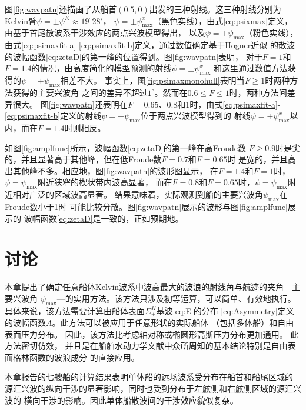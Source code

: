 图\ref{fig:wavpatn}还描画了从船首$(0.5,0)$出发的三种射线。这三种射线分别为
Kelvin臂$\psi=\pm\psi^K\approx19^\circ28'$，
$\psi=\pm\psi^x_{\max}$（黑色实线），由式\eqref{eq:psixmax}定义，
由基于首尾散波系干涉效应的两点兴波模型\supercite{Noblesse2014Why}得出，
以及$\psi=\pm\psi_{\max}$（粉色实线），
由式\eqref{eq:psimaxfit-a}-\eqref{eq:psimaxfit-b}定义，通过数值确定基于Hogner近似
的散波的波幅函数\eqref{eq:zetaD}的第一峰的位置得到。图\ref{fig:wavpatn}表明，
对于$F=1$和$F=1.4$的情况，由高度简化的模型预测的射线$\psi=\pm\psi^x_{\max}$
和这里通过数值方法获得的$\psi=\pm\psi_{\max}$相差不大。
事实上，图\ref{fig:psimaxmonohull}表明当$F\ge1$时两种方法获得的主要兴波角
之间的差异不超过$1^\circ$。然而在$0.6\le F\le1$时，两种方法间差异很大。
图\ref{fig:wavpatn}还表明在$F=0.65$、0.8和1时，由式\eqref{eq:psimaxfit-a}-
\eqref{eq:psimaxfit-b}定义的射线$\psi=\pm\psi_{\max}$位于两点兴波模型得到的
射线$\psi=\pm\psi^x_{\max}$以内，而在$F=1.4$时则相反。

如图\ref{fig:amplfunc}所示，波幅函数\eqref{eq:zetaD}的第一峰在高Froude数
$F\ge0.9$时是尖的，并且显著高于其他峰，但在低Froude数$F=0.7$和$F=0.65$时
是宽的，并且高出其他峰不多。相应地，图\ref{fig:wavpatn}的波形图显示，
在$F=1.4$和$F=1$时，$\psi=\psi_{\max}$附近狭窄的楔状带内波高显著，
而在$F=0.8$和$F=0.65$时，$\psi=\psi_{\max}$附近相对广泛的区域波高显著。
结果意味着，实际观测到船的主要兴波角$\psi_{\max}$在Froude数小于1时
可能比较分散。图\ref{fig:wavpatn}展示的波形与图\ref{fig:amplfunc}展示的
波幅函数\eqref{eq:zetaD}是一致的，正如预期地。

\section{讨论}
\label{sec:discuz}

本章提出了确定任意船体Kelvin波系中波高最大的波浪的射线角与航迹的夹角---主要兴波角
$\psi_{\max}$---的实用方法。该方法只涉及初等运算，可以简单、有效地执行。
具体来说，该方法需要计算由船体表面$\Sigma^H_+$基波\eqref{eq:E}的分布
\eqref{eq:Asymmetry}定义的波幅函数$A$。此方法可以被应用于任意形状的实际船体
（包括多体船）和自由表面压力分布。
因此，该方法比考虑轴对称或椭圆形高斯压力分布更加通用。
此方法密切仿效\parencite{Barnell1986Far}，
并且是在船舶水动力学文献中众所周知的基本结论特别是自由表面格林函数的波浪成分
\supercite{Noblesse1981Alternative}
的直接应用。

本章报告的七艘船的计算结果表明单体船的远场波系受分布在船首和船尾区域的
源汇兴波的纵向干涉的显著影响，同时也受到分布于左舷侧和右舷侧区域的源汇兴波的
横向干涉的影响。因此单体船散波间的干涉效应貌似复杂。

